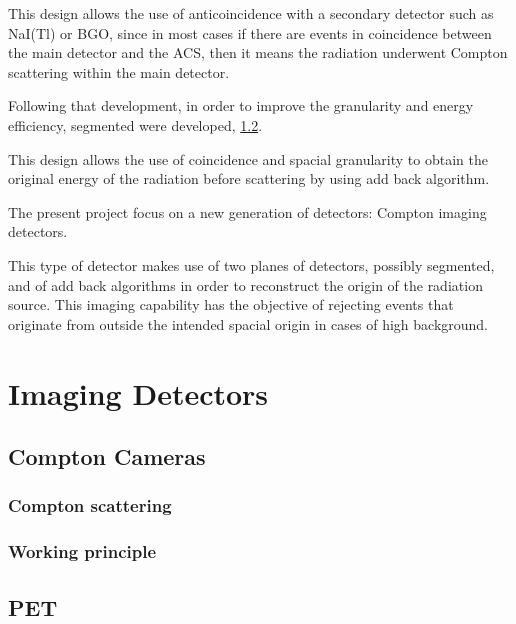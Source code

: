 This design allows the use of anticoincidence with a secondary detector such as NaI(Tl) or BGO, since in most cases if there are events in coincidence between the main detector and the \ac{ACS}, then it means the radiation underwent Compton scattering within the main detector.

Following that development, in order to improve the granularity and energy efficiency, segmented were developed, \ref{}.

This design allows the use of coincidence and spacial granularity to obtain the original energy of the radiation before scattering by using add back algorithm.

The present project focus on a new generation of detectors: Compton imaging detectors.

This type of detector makes use of two planes of detectors, possibly segmented, and of add back algorithms in order to reconstruct the origin of the radiation source. This imaging capability has the objective of rejecting events that originate from outside the intended spacial origin in cases of high background.

\section{Imaging Detectors}

\subsection{Compton Cameras}

\subsubsection{Compton scattering}

\subsubsection{Working principle}

\subsection{PET}

